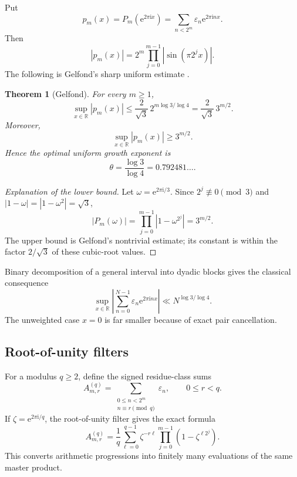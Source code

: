 \documentclass[11pt,oneside]{article}
\newtheorem{theorem}{Theorem}[section]
\theoremstyle{definition}
\theoremstyle{remark}
\newcommand{\R}{\mathbb R}
\newcommand{\e}{\mathrm e}
\newcommand{\ii}{\mathrm i}
\newcommand{\eps}{\varepsilon}
\begin{document}
Put
\begin{equation}\label{eq:thue-morse-polynomial-circle}
 p_m(x)=P_m(\e^{2\pi\ii x})
 =\sum_{n<2^m}\eps_n\e^{2\pi\ii nx}.
\end{equation}
Then
\begin{equation}\label{eq:p-magnitude-sine}
 |p_m(x)|=2^m\prod_{j=0}^{m-1}|\sin(\pi2^jx)|.
\end{equation}
The following is Gelfond's sharp uniform estimate
\cite{gelfond1968,queffelec2018}.

\begin{theorem}[Gelfond]\label{thm:gelfond}
For every $m\ge1$,
\begin{equation}\label{eq:gelfond-bound}
 \sup_{x\in\R}|p_m(x)|
 \le\frac{2}{\sqrt3}\,2^{m\log 3/\log4}
 =\frac{2}{\sqrt3}\,3^{m/2}.
\end{equation}
Moreover,
\begin{equation}\label{eq:gelfond-lower}
 \sup_{x\in\R}|p_m(x)|\ge3^{m/2}.
\end{equation}
Hence the optimal uniform growth exponent is
\begin{equation}\label{eq:gelfond-exponent}
 \theta=\frac{\log3}{\log4}=0.792481\ldots.
\end{equation}
\end{theorem}

\begin{proof}[Explanation of the lower bound]
Let $\omega=\e^{2\pi\ii/3}$.  Since $2^j\not\equiv0\pmod3$ and
$|1-\omega|=|1-\omega^2|=\sqrt3$,
\[
 |P_m(\omega)|=\prod_{j=0}^{m-1}|1-\omega^{2^j}|=3^{m/2}.
\]
The upper bound is Gelfond's nontrivial estimate; its constant is within the
factor $2/\sqrt3$ of these cubic-root values.
\end{proof}

Binary decomposition of a general interval into dyadic blocks gives the
classical consequence
\begin{equation}\label{eq:gelfond-general-N}
 \sup_{x\in\R}\left|
  \sum_{n=0}^{N-1}\eps_n\e^{2\pi\ii nx}
 \right|\ll N^{\log3/\log4}.
\end{equation}
The unweighted case $x=0$ is far smaller because of exact pair cancellation.

\subsection{Root-of-unity filters}

For a modulus $q\ge2$, define the signed residue-class sums
\begin{equation}\label{eq:rarefied-def}
 A_{m,r}^{(q)}=
 \sum_{\substack{0\le n<2^m\\n\equiv r\pmod q}}\eps_n,
 \qquad 0\le r<q.
\end{equation}
If $\zeta=\e^{2\pi\ii/q}$, the root-of-unity filter gives the exact formula
\begin{equation}\label{eq:rarefied-root-filter}
 \boxed{\quad
 A_{m,r}^{(q)}=\frac1q\sum_{\ell=0}^{q-1}
 \zeta^{-r\ell}\prod_{j=0}^{m-1}
  \left(1-\zeta^{\ell2^j}\right).
 \quad}
\end{equation}
This converts arithmetic progressions into finitely many evaluations of the
same master product.
\end{document}
